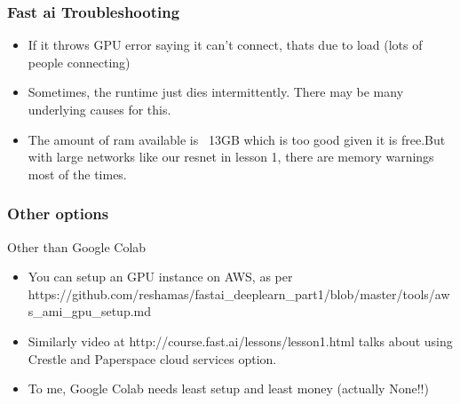 \begin{frame}[fragile] \frametitle{Fast ai Troubleshooting}
\begin{itemize}
\item If it throws GPU error saying it can't connect, thats due to load (lots of people connecting)
\item Sometimes, the runtime just dies intermittently. There may be many underlying causes for this.
\item The amount of ram available is ~13GB which is too good given it is free.But with large networks like our resnet in lesson 1, there are memory warnings most of the times. 
\end{itemize}

\end{frame}


\begin{frame}[fragile]\frametitle{Other options}
Other than Google Colab
\begin{itemize}
\item You can setup an GPU instance on AWS, as per https://github.com/reshamas/fastai\_deeplearn\_part1/blob/master/tools/aws\_ami\_gpu\_setup.md
\item Similarly video at http://course.fast.ai/lessons/lesson1.html talks about using Crestle and Paperspace cloud services option.
\item To me, Google Colab needs least setup and least money (actually None!!)
\end{itemize}
\end{frame}
